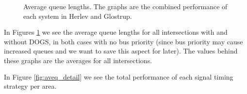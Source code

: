 \begin{figure}[htbp]
\centering
{}
\caption{Average queue lengths. The graphs are the combined performance of each system in Herlev and Glostrup.}
\label{fig:aveq}
\end{figure}

In Figures \ref{fig:aveq} we see the average queue lengths for all intersections with and without DOGS, in both cases with no bus priority (since bus priority may cause increased queues and we want to save this aspect for later). The values behind these graphs are the averages for all intersections.

In Figure \ref{fig:aveq_detail} we see the total performance of each signal timing strategy per area. 

